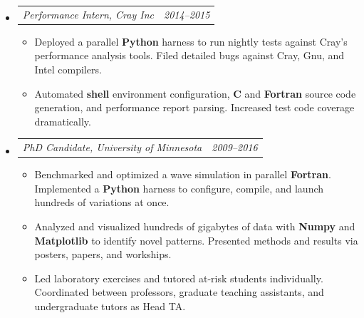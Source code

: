 \documentclass[12pt,letterpaper]{article}
\makeatletter
\newcommand{\headerpair}[2]{
    \begin{tabular*}{\linewidth}{l@{ \extracolsep{\fill} }r} {\large\emph{#1}} & {\large\emph{#2}}
    \end{tabular*}
}
\newcommand{\headerrow}[3]{\headerpair{#1, #2}{#3}}
\newcommand{\YearRange}[2]{#1--#2}
\newcommand{\CPP}{C\nolinebreak[4]\hspace{-.05em}\raisebox{.22ex}{\footnotesize\bf ++}\xspace}
\makeatother
\begin{document}
\begin{itemize}[leftmargin=\parindent]
    \item[]
        \headerrow
            {Performance Intern}
            {Cray Inc}
            {\YearRange{2014}{2015}}
        \begin{itemize}[leftmargin=\parindent]
            \item Deployed a parallel \textbf{Python} harness to run nightly tests against Cray's performance analysis tools. Filed detailed bugs against Cray, Gnu, and Intel compilers.
            \item Automated \textbf{shell} environment configuration, \textbf{\CPP} and \textbf{Fortran} source code generation, and performance report parsing. Increased test code coverage dramatically.
        \end{itemize}
    \item[]
        \headerrow
            {PhD Candidate}
            {University of Minnesota}
            {\YearRange{2009}{2016}}
        \begin{itemize}[leftmargin=\parindent]
            \item Benchmarked and optimized a wave simulation in parallel \textbf{Fortran}. Implemented a \textbf{Python} harness to configure, compile, and launch hundreds of variations at once.
            \item Analyzed and visualized hundreds of gigabytes of data with \textbf{Numpy} and \textbf{Matplotlib} to identify novel patterns. Presented methods and results via posters, papers, and workships.
            \item Led laboratory exercises and tutored at-risk students individually. Coordinated between professors, graduate teaching assistants, and undergraduate tutors as Head TA.
        \end{itemize}
\end{itemize}
\end{document}
